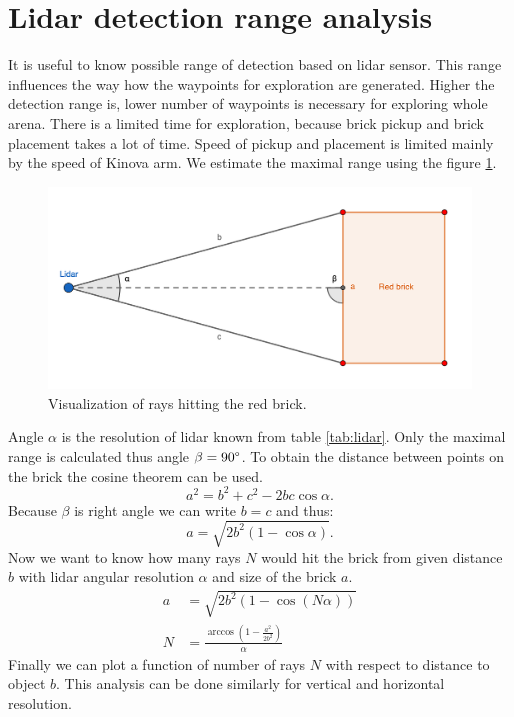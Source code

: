 \section{Lidar detection range analysis}
It is useful to know possible range of detection based on lidar sensor. This range influences the way how the waypoints for exploration are generated. Higher the detection range is, lower number of waypoints is necessary for exploring whole arena. There is a limited time for exploration, because brick pickup and brick placement takes a lot of time. Speed of pickup and placement is limited mainly by the speed of Kinova arm. We estimate the maximal range using the figure \ref{fig:range}.

\begin{figure}[H]
\centering
\includegraphics[scale=1.1]{fig/lidar_range.png}
\caption[Lidar range study]{Visualization of rays hitting the red brick.}
\label{fig:range}
\end{figure}

Angle $\alpha$ is the resolution of lidar known from table \ref{tab:lidar}. Only the maximal range is calculated thus angle $\beta = 90\degree$. To obtain the distance between points on the brick the cosine theorem can be used.
\begin{equation}
a^2 = b^2 + c^2 - 2bc \cos \alpha.
\end{equation}
Because $\beta$ is right angle we can write $b = c$ and thus:
\begin{equation}
a = \sqrt{2b^2 \left(1-\cos \alpha \right)}.
\end{equation}
Now we want to know how many rays $N$ would hit the brick from given distance $b$ with lidar angular resolution $\alpha$ and size of the brick $a$. 
\begin{align}
a &= \sqrt{2b^2 \left(1-\cos \left( N \alpha \right) \right)} \\
N &= \frac{\arccos\left(1-\frac{a^2}{2b^2}\right) }{\alpha}
\label{eq:rays}
\end{align}
Finally we can plot a function of number of rays $N$ with respect to distance to object $b$. This analysis can be done similarly for vertical and horizontal resolution.

